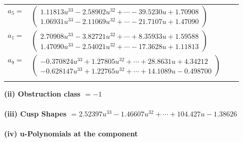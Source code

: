\documentclass[1p]{elsarticle_modified}
\theoremstyle{definition}
\begin{document}
\begin{tabular}{m{7pt} m{180pt} m{7pt} m{180pt} }
\flushright $a_{5}=$&$\begin{pmatrix}1.11813 u^{33}-2.58902 u^{32}+\cdots-39.5230 u+1.70908\\1.06931 u^{33}-2.11069 u^{32}+\cdots-21.7107 u+1.47090\end{pmatrix}$ \\
\flushright $a_{1}=$&$\begin{pmatrix}2.70908 u^{33}-3.82721 u^{32}+\cdots+8.35933 u+1.59588\\1.47090 u^{33}-2.54021 u^{32}+\cdots-17.3628 u+1.11813\end{pmatrix}$ \\
\flushright $a_{9}=$&$\begin{pmatrix}-0.370824 u^{33}+1.27805 u^{32}+\cdots+28.8631 u+4.34212\\-0.628147 u^{33}+1.22765 u^{32}+\cdots+14.1089 u-0.498700\end{pmatrix}$\\&\end{tabular}
\flushleft \textbf{(ii) Obstruction class $= -1$}\\~\\
\flushleft \textbf{(iii) Cusp Shapes $= 2.52397 u^{33}-1.46607 u^{32}+\cdots+104.427 u-1.38626$}\\~\\
\newpage\renewcommand{\arraystretch}{1}
\flushleft \textbf{(iv) u-Polynomials at the component}\newline \\
\end{document}
